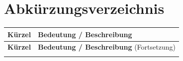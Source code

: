 \documentclass[12pt,a4paper,oneside]{report}
\begin{document}
\nocite{austrocontrol_sora, easa_rules}
\newpage

\tableofcontents
\newpage

\chapter*{Abkürzungsverzeichnis}

\small 

\begin{longtable}{p{2.5cm} p{11cm}}
    \toprule
    \textbf{Kürzel} & \textbf{Bedeutung / Beschreibung} \\
    \midrule
    \endfirsthead %
    
    \toprule
    \textbf{Kürzel} & \textbf{Bedeutung / Beschreibung} (Fortsetzung) \\
    \midrule
    \endhead %
    
    \bottomrule
    \endfoot %
    
    \bottomrule
    \endlastfoot %


\end{longtable}
\end{document}
